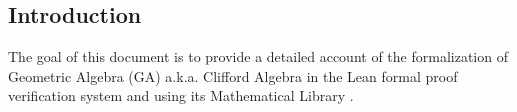 \subsection*{Introduction}
\label{sec:intro}

The goal of this document is to provide a detailed account
of the formalization of Geometric Algebra (GA) a.k.a. Clifford Algebra \cite{hestenes2012clifford}
in the Lean formal proof verification system \cite{lean_2015}
and using its Mathematical Library \cite{themathlibcommunityLeanMathematicalLibrary2020}.